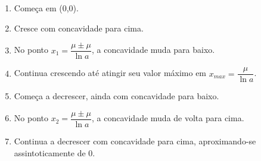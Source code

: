 \documentclass[../resumo.tex]{subfiles}
\begin{document}
	\begin{enumerate}
		\item Começa em (0,0).
		\item Cresce com concavidade para cima.
		\item No ponto $x_1 = \dfrac{\mu \pm \mu}{\ln a}$, a concavidade muda para baixo.
		\item Continua crescendo até atingir seu valor máximo em $x_{max} = \dfrac{\mu}{\ln a}$.
		\item Começa a decrescer, ainda com concavidade para baixo.
		\item No ponto $x_2 = \dfrac{\mu \pm \mu}{\ln a}$, a concavidade muda de volta para cima.
		\item Continua a decrescer com concavidade para cima, aproximando-se assintoticamente de 0.
	\end{enumerate}
\end{document}

